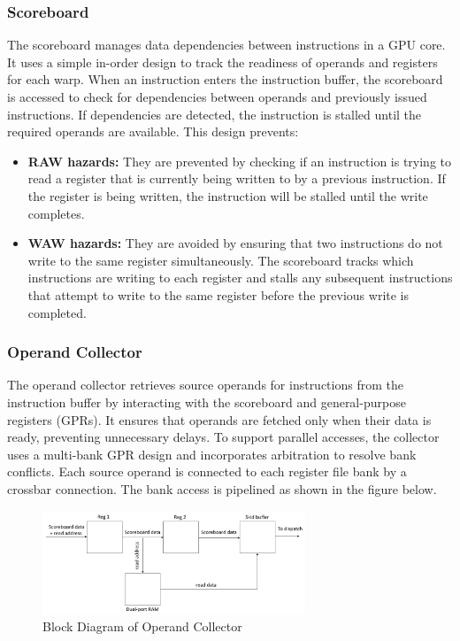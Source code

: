 \documentclass[12pt]{report}
\begin{document}
\subsubsection{Scoreboard}
The scoreboard manages data dependencies between instructions in a GPU core. It uses a simple in-order design to track the readiness of operands and registers for each warp. When an instruction enters the instruction buffer, the scoreboard is accessed to check for dependencies between operands and previously issued instructions. If dependencies are detected, the instruction is stalled until the required operands are available. This design prevents:

\begin{itemize}
    \item \textbf{RAW hazards:} They are prevented by checking if an instruction is trying to read a register that is currently being written to by a previous instruction. If the register is being written, the instruction will be stalled until the write completes.
    \item \textbf{WAW hazards:} They are avoided by ensuring that two instructions do not write to the same register simultaneously. The scoreboard tracks which instructions are writing to each register and stalls any subsequent instructions that attempt to write to the same register before the previous write is completed.
\end{itemize}

\subsubsection{Operand Collector}
The operand collector retrieves source operands for instructions from the instruction buffer by interacting with the scoreboard and general-purpose registers (GPRs). It ensures that operands are fetched only when their data is ready, preventing unnecessary delays. To support parallel accesses, the collector uses a multi-bank GPR design and incorporates arbitration to resolve bank conflicts. Each source operand is connected to each register file bank by a crossbar connection. The bank access is pipelined as shown in the figure below.
\begin{figure}[H]
    \centering
    \includegraphics[width=0.7\textwidth]{./figures/operand_collector.png}
    \caption{Block Diagram of Operand Collector}
\end{figure}
\end{document}
